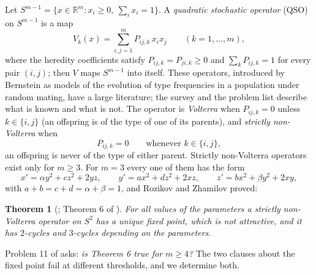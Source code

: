 \documentclass[11pt]{amsart}
\newtheorem{theorem}{Theorem}[section]
\theoremstyle{definition}
\newcommand{\R}{\mathbb{R}}
\newcommand{\Simp}{S^{m-1}}
\begin{document}
Let $\Simp=\{x\in\R^m: x_i\ge0,\ \sum_ix_i=1\}$. A \emph{quadratic stochastic operator} (QSO) on $\Simp$ is a map
\begin{equation}\label{eq:qso}
V_k(x)=\sum_{i,j=1}^m P_{ij,k}\,x_ix_j\qquad(k=1,\dots,m),
\end{equation}
where the heredity coefficients satisfy $P_{ij,k}=P_{ji,k}\ge0$ and $\sum_kP_{ij,k}=1$ for every pair $(i,j)$; then $V$ maps $\Simp$ into itself. These operators, introduced by Bernstein as models of the evolution of type frequencies in a population under random mating, have a large literature; the survey \cite{GMR11} and the problem list \cite{GR09} describe what is known and what is not. The operator is \emph{Volterra} when $P_{ij,k}=0$ unless $k\in\{i,j\}$ (an offspring is of the type of one of its parents), and \emph{strictly non-Volterra} when
\begin{equation}\label{eq:snv}
P_{ij,k}=0\qquad\text{whenever }k\in\{i,j\},
\end{equation}
an offspring is never of the type of either parent. Strictly non-Volterra operators exist only for $m\ge3$. For $m=3$ every one of them has the form
\[
x'=\alpha y^2+cz^2+2yz,\qquad y'=ax^2+dz^2+2xz,\qquad z'=bx^2+\beta y^2+2xy,
\]
with $a+b=c+d=\alpha+\beta=1$, and Rozikov and Zhamilov \cite{RZ09} proved:

\begin{theorem}[{\cite{RZ09}; Theorem 6 of \cite{GR09}}]\label{thm:six}
For all values of the parameters a strictly non-Volterra operator on $S^2$ has a unique fixed point, which is not attractive, and it has $2$-cycles and $3$-cycles depending on the parameters.
\end{theorem}

Problem 11 of \cite{GR09} asks: \emph{is Theorem 6 true for $m\ge4$?} The two clauses about the fixed point fail at different thresholds, and we determine both.
\end{document}
